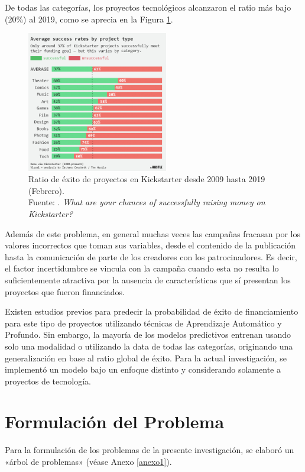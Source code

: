 De todas las categorías, los proyectos tecnológicos alcanzaron el ratio más bajo (20\%) al 2019, como se aprecia en la Figura \ref{1:fig2}.
\begin{figure}[h]
	\begin{center}
		\includegraphics[width=0.55\textwidth]{1/figures/kickstarter_success_rate_2009_2019.jpg}
		\caption[Ratio de éxito de proyectos en Kickstarter desde 2009 hasta 2019 (Febrero)]{Ratio de éxito de proyectos en Kickstarter desde 2009 hasta 2019 (Febrero).\\
		Fuente: \cite{cr_hustle2019successrate}. \textit{What are your chances of successfully raising money on Kickstarter?}}
		\label{1:fig2}
	\end{center}
\end{figure}

Además de este problema, en general muchas veces las campañas fracasan por los valores incorrectos que toman sus variables, desde el contenido de la publicación hasta la comunicación de parte de los creadores con los patrocinadores. Es decir, el factor incertidumbre se vincula con la campaña cuando esta no resulta lo suficientemente atractiva por la ausencia de características que sí presentan los proyectos que fueron financiados.

Existen estudios previos para predecir la probabilidad de éxito de financiamiento para este tipo de proyectos utilizando técnicas de Aprendizaje Automático y Profundo. Sin embargo, la mayoría de los modelos predictivos entrenan usando solo una modalidad o utilizando la data de todas las categorías, originando una generalización en base al ratio global de éxito. Para la actual investigación, se implementó un modelo bajo un enfoque distinto y considerando solamente a proyectos de tecnología.

\section{Formulación del Problema}
Para la formulación de los problemas de la presente investigación, se elaboró un «árbol de problemas» (véase Anexo \ref{anexo1}).

